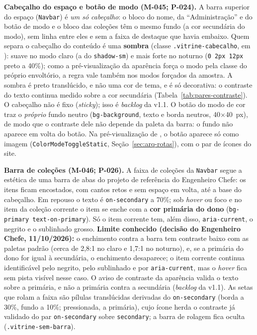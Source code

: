 \textbf{Cabeçalho do espaço e botão de modo (M-045; P-024).} A barra superior do espaço (\texttt{Navbar}) é \emph{um só cabeçalho}: o bloco do nome, da ``Administração'' e do botão de modo e o bloco das coleções têm o mesmo fundo (a cor secundária do modo), sem linha entre eles e sem a faixa de destaque que havia embaixo. Quem separa o cabeçalho do conteúdo é uma \textbf{sombra} (classe \texttt{.vitrine-cabecalho}, em ): suave no modo claro (a do \texttt{shadow-sm}) e mais forte no noturno (\texttt{0 2px 12px} preto a 40\%); como a pré-visualização da aparência força o modo pela classe do próprio envoltório, a regra vale também nos modos forçados da amostra. A sombra é preto translúcido, e não uma cor de tema, e é só decorativa: o contraste do texto continua medido sobre a cor secundária (Tabela~\ref{tab:pares-contraste}). O cabeçalho não é fixo (\emph{sticky}); isso é \emph{backlog} da v1.1. O botão do modo de cor traz o \emph{próprio} fundo neutro (\texttt{bg-background}, texto e borda neutros, 40$\times$40~px), de modo que o contraste dele não depende da paleta da barra: o fundo não aparece em volta do botão. Na pré-visualização de , o botão aparece só como imagem (\texttt{ColorModeToggleStatic}, Seção~\ref{sec:arq-rotas}), com o par de ícones do site.

\textbf{Barra de coleções (M-046; P-026).} A faixa de coleções da \texttt{Navbar} segue a estética de uma barra de abas do projeto de referência do Engenheiro Chefe: os itens ficam encostados, com cantos retos e sem espaço em volta, até a base do cabeçalho. Em repouso o texto é \texttt{on-secondary} a 70\%; sob \emph{hover} ou foco e no item da coleção corrente o item se enche com a \textbf{cor primária do dono} (\texttt{bg-primary text-on-primary}). Só o item corrente tem, além disso, \texttt{aria-current}, o negrito e o sublinhado grosso. \textbf{Limite conhecido (decisão do Engenheiro Chefe, 11/10/2026):} o enchimento contra a barra tem contraste baixo com as paletas padrão (cerca de 2,8:1 no claro e 1,7:1 no noturno), e, se a primária do dono for igual à secundária, o enchimento desaparece; o item corrente continua identificável pelo negrito, pelo sublinhado e por \texttt{aria-current}, mas o \emph{hover} fica sem pista visível nesse caso. O aviso de contraste da aparência valida o texto sobre a primária, e não a primária contra a secundária (\emph{backlog} da v1.1). As setas que rolam a faixa são pílulas translúcidas derivadas do \texttt{on-secondary} (borda a 30\%, fundo a 10\%; pressionada, a primária), cujo ícone herda o contraste já validado do par \texttt{on-secondary} sobre \texttt{secondary}; a barra de rolagem fica oculta (\texttt{.vitrine-sem-barra}).

